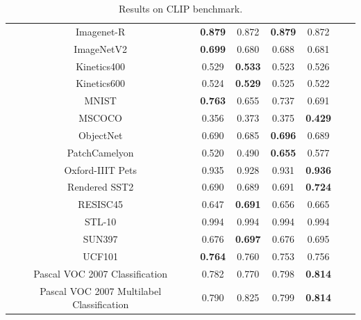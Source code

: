 \begin{table}[]
\begin{tabular}{c|cccccc}
Imagenet-R          & \textbf{0.879}    & 0.872    & \textbf{0.879}           & 0.872      \\
ImageNetV2              & \textbf{0.699}    & 0.680    & 0.688           & 0.681      \\
Kinetics400            & 0.529    & \textbf{0.533}    & 0.523           & 0.526      \\
Kinetics600          & 0.524    & \textbf{0.529}    & 0.525           & 0.522      \\
MNIST                  & \textbf{0.763}    & 0.655    & 0.737           & 0.691      \\
MSCOCO & 0.356     & 0.373    & 0.375           & \textbf{0.429}      \\
ObjectNet              & 0.690    & 0.685    & \textbf{0.696}           & 0.689      \\
PatchCamelyon                      & 0.520    & 0.490    & \textbf{0.655}           & 0.577      \\
Oxford-IIIT Pets              & 0.935    & 0.928    & 0.931           & \textbf{0.936}      \\
Rendered SST2            & 0.690    & 0.689    & 0.691           & \textbf{0.724}      \\
RESISC45              & 0.647    & \textbf{0.691}    & 0.656           & 0.665      \\
STL-10                 & 0.994    & 0.994    & 0.994           & 0.994      \\
SUN397                & 0.676    & \textbf{0.697}    & 0.676           & 0.695      \\
UCF101                  & \textbf{0.764}    & 0.760    & 0.753           & 0.756      \\
Pascal VOC 2007 Classification                  & 0.782    & 0.770    & 0.798           & \textbf{0.814}      \\
Pascal VOC 2007 Multilabel Classification           & 0.790    & 0.825    & 0.799           & \textbf{0.814}      \\\hline
\end{tabular}
\caption{Results on CLIP benchmark.\label{tab:ccl}}
\end{table}
